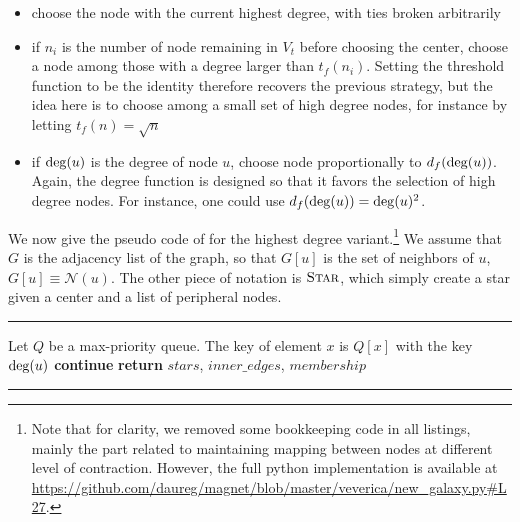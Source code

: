 \begin{itemize}%
  \item choose the node with the current highest degree, with ties broken arbitrarily
  \item if $n_i$ is the number of node remaining in $V_t$ before choosing the \ith{} center, choose
    a node \uar{} among those with a degree larger than $t_f(n_i)$. Setting the threshold function
    to be the identity therefore recovers the previous strategy, but the idea here is to choose
    among a small set of high degree nodes, for instance by letting $t_f(n) = \sqrt{n}$
  \item if $\operatorname{deg}(u)$ is the degree of node $u$, choose node proportionally to $d_f(\operatorname{deg}(u))$.
    Again, the degree function is designed so that it favors the selection of high degree nodes. For
    instance, one could use $d_f(\operatorname{deg}(u)) = \operatorname{deg}(u)^2$.
\end{itemize}

We now give the pseudo code of \extractStar{} for the highest degree variant.\footnote{Note that for
clarity, we removed some bookkeeping code in all listings, mainly the part related to maintaining
mapping between nodes at different level of contraction. However, the full python implementation
is available at \url{https://github.com/daureg/magnet/blob/master/veverica/new_galaxy.py\#L27}.}
We assume that $G$ is the adjacency list of the graph, so that $G[u]$ is the set of neighbors of
$u$, \ie{} $G[u] \equiv \mathcal{N}(u)$. The other piece of notation is $\textsc{Star}$, which
simply create a star given a center and a list of peripheral nodes.  \vspace{-\baselineskip}

\begin{center}
  \rule{\textwidth}{.3pt}
  \begin{algorithmic}[1]
      \State Let $Q$ be a max-priority queue. The key of element $x$ is $Q[x]$
        \State {} \Comment with the key $\operatorname{deg}(u)$
      \EndFor
          \State \textbf{continue} 
        \EndIf
            \State {}
          \EndFor
        \EndFor
      \EndWhile
      \State \textbf{return} $stars$, $inner\_edges$, $membership$%
    \EndFunction
  \end{algorithmic}
  \rule{\textwidth}{.3pt}
\end{center}

